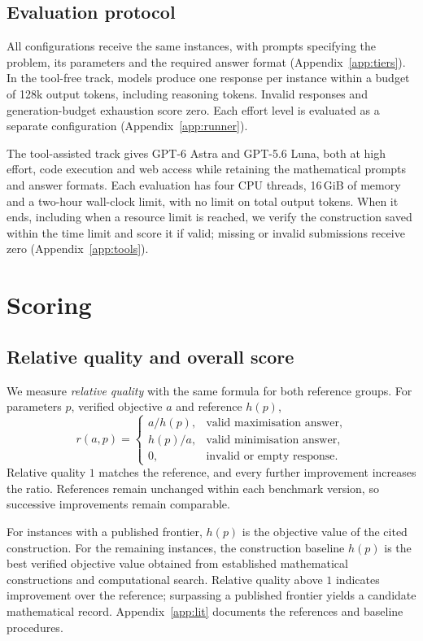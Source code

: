 \documentclass{article}
\begin{document}
\subsection{Evaluation protocol}
\label{sec:protocol}
All configurations receive the same instances, with prompts specifying the problem, its parameters and the required answer format (Appendix~\ref{app:tiers}). In the tool-free track, models produce one response per instance within a budget of 128k output tokens, including reasoning tokens. Invalid responses and generation-budget exhaustion score zero. Each effort level is evaluated as a separate configuration (Appendix~\ref{app:runner}).

The tool-assisted track gives GPT-6 Astra and GPT-5.6 Luna, both at high effort, code execution and web access while retaining the mathematical prompts and answer formats. Each evaluation has four CPU threads, 16\,GiB of memory and a two-hour wall-clock limit, with no limit on total output tokens. When it ends, including when a resource limit is reached, we verify the construction saved within the time limit and score it if valid; missing or invalid submissions receive zero (Appendix~\ref{app:tools}).

\section{Scoring}
\label{sec:scoring}

\subsection{Relative quality and overall score}
We measure \emph{relative quality} with the same formula for both reference groups. For parameters $p$, verified objective $a$ and reference $h(p)$,
\[
r(a,p)=
\begin{cases}
a/h(p), & \text{valid maximisation answer},\\
h(p)/a, & \text{valid minimisation answer},\\
0, & \text{invalid or empty response}.
\end{cases}
\]
Relative quality $1$ matches the reference, and every further improvement increases the ratio. References remain unchanged within each benchmark version, so successive improvements remain comparable.

For instances with a published frontier, $h(p)$ is the objective value of the cited construction. For the remaining instances, the construction baseline $h(p)$ is the best verified objective value obtained from established mathematical constructions and computational search. Relative quality above $1$ indicates improvement over the reference; surpassing a published frontier yields a candidate mathematical record. Appendix~\ref{app:lit} documents the references and baseline procedures.
\end{document}

